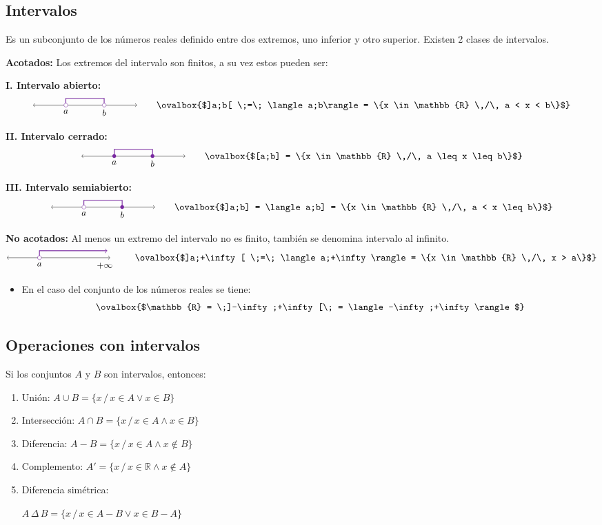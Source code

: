 \documentclass[11pt,a4paper]{article}
\newcommand{\cn}[1]{\raisebox{.5pt}{\textcircled{\raisebox{-.9pt}{\scriptsize #1}}}}
\newcommand{\intervalo}[3]{%
\begin{tikzpicture}[baseline=-3pt]
  \draw[<->] (-0.4,0) -- (3.4,0);
  \if i#3
    \draw[<-,thick,graf] (3.3,0.25) -- (0.8,0.25) -- (0.8,0);
    \node[below] at (0.8,-0.05) {\small $a$};
    \node[below] at (3.2,-0.05) {\small $+\infty$};
  \else
    \draw[thick,graf] (0.8,0) -- (0.8,0.25) -- (2.2,0.25) -- (2.2,0);
    \node[below] at (0.8,-0.05) {\small $a$}; \node[below] at (2.2,-0.05) {\small $b$};
    \if c#2 \fill[graf] (2.2,0) circle (2pt); \else \draw[graf,fill=white] (2.2,0) circle (2pt); \fi
  \fi
  \if c#1 \fill[graf] (0.8,0) circle (2pt); \else \draw[graf,fill=white] (0.8,0) circle (2pt); \fi
\end{tikzpicture}}
\begin{document}
\subsection*{Intervalos}
Es un subconjunto de los números reales definido entre dos extremos, uno inferior y otro
superior. Existen 2 clases de intervalos.

\textcolor{verde}{\textbf{Acotados:}} Los extremos del intervalo son finitos, a su vez estos
pueden ser:

\textcolor{naranja}{\textbf{I. Intervalo abierto:}}
\[\intervalo{o}{o}{f} \qquad \ovalbox{$]a;b[ \;=\; \langle a;b\rangle = \{x \in \mathbb{R} \,/\, a < x < b\}$}\]

\textcolor{naranja}{\textbf{II. Intervalo cerrado:}}
\[\intervalo{c}{c}{f} \qquad \ovalbox{$[a;b] = \{x \in \mathbb{R} \,/\, a \leq x \leq b\}$}\]

\textcolor{naranja}{\textbf{III. Intervalo semiabierto:}}
\[\intervalo{o}{c}{f} \qquad \ovalbox{$]a;b] = \langle a;b] = \{x \in \mathbb{R} \,/\, a < x \leq b\}$}\]

\textcolor{verde}{\textbf{No acotados:}} Al menos un extremo del intervalo no es finito, también
se denomina intervalo al infinito.
\[\intervalo{o}{o}{i} \qquad \ovalbox{$]a;+\infty[ \;=\; \langle a;+\infty\rangle = \{x \in \mathbb{R} \,/\, x > a\}$}\]

\begin{itemize}
  \item En el caso del conjunto de los números reales se tiene:
  \[\ovalbox{$\mathbb{R} = \;]-\infty;+\infty[\; = \langle -\infty;+\infty\rangle$}\]
\end{itemize}

\subsection*{Operaciones con intervalos}
Si los conjuntos $A$ y $B$ son intervalos, entonces:

\begin{minipage}[t]{0.485\textwidth}
\begin{enumerate}[label=\cn{\arabic*}]
  \item Unión: $A \cup B = \{x \,/\, x \in A \vee x \in B\}$
  \item Intersección: $A \cap B = \{x \,/\, x \in A \wedge x \in B\}$
  \item Diferencia: $A - B = \{x \,/\, x \in A \wedge x \notin B\}$
\end{enumerate}
\end{minipage}\hfill
\begin{minipage}[t]{0.485\textwidth}
\begin{enumerate}[label=\cn{\arabic*}]\setcounter{enumi}{3}
  \item Complemento: $A' = \{x \,/\, x \in \mathbb{R} \wedge x \notin A\}$
  \item Diferencia simétrica:

  $A \,\Delta\, B = \{x \,/\, x \in A - B \vee x \in B - A\}$
\end{enumerate}
\end{minipage}
\end{document}
